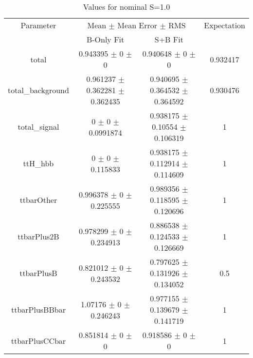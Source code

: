 \begin{table}
\centering
\caption{Values for nominal S=1.0}
\begin{tabular}{cccc}
\toprule
Parameter & \multicolumn{2}{c}{Mean $\pm$ Mean Error $\pm$ RMS} & Expectation\\
 & B-Only Fit & S+B Fit & \\
\midrule
total & \num{0.943395} $\pm$ \num{0} $\pm$ \num{0} & \num{0.940648} $\pm$ \num{0} $\pm$ \num{0} & \num{0.932417}\\
total\_background & \num{0.961237} $\pm$ \num{0.362281} $\pm$ \num{0.362435} & \num{0.940695} $\pm$ \num{0.364532} $\pm$ \num{0.364592} & \num{0.930476}\\
total\_signal & \num{0} $\pm$ \num{0} $\pm$ \num{0.0991874} & \num{0.938175} $\pm$ \num{0.10554} $\pm$ \num{0.106319} & \num{1}\\
ttH\_hbb & \num{0} $\pm$ \num{0} $\pm$ \num{0.115833} & \num{0.938175} $\pm$ \num{0.112914} $\pm$ \num{0.114609} & \num{1}\\
ttbarOther & \num{0.996378} $\pm$ \num{0} $\pm$ \num{0.225555} & \num{0.989356} $\pm$ \num{0.118595} $\pm$ \num{0.120696} & \num{1}\\
ttbarPlus2B & \num{0.978299} $\pm$ \num{0} $\pm$ \num{0.234913} & \num{0.886538} $\pm$ \num{0.124533} $\pm$ \num{0.126669} & \num{1}\\
ttbarPlusB & \num{0.821012} $\pm$ \num{0} $\pm$ \num{0.243532} & \num{0.797625} $\pm$ \num{0.131926} $\pm$ \num{0.134052} & \num{0.5}\\
ttbarPlusBBbar & \num{1.07176} $\pm$ \num{0} $\pm$ \num{0.246243} & \num{0.977155} $\pm$ \num{0.139679} $\pm$ \num{0.141719} & \num{1}\\
ttbarPlusCCbar & \num{0.851814} $\pm$ \num{0} $\pm$ \num{0} & \num{0.918586} $\pm$ \num{0} $\pm$ \num{0} & \num{1}\\
\bottomrule
\end{tabular}
\end{table}